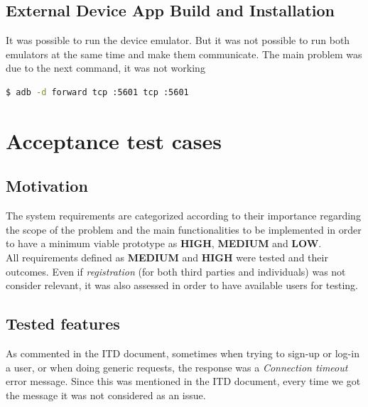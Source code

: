 \documentclass[a4paper, hidelinks, 12pt]{report}
\begin{document}
\begin{itemize}
\begin{enumerate}
	\section{External Device App Build and Installation}
	It was possible to run the device emulator. But it was not possible to run both emulators at the same time and make them communicate. The main problem was due to the next command, it was not working
	
		\begin{lstlisting}[language=bash]
			$ adb -d forward tcp :5601 tcp :5601
		\end{lstlisting}
	
		\end{enumerate}
	\end{itemize}

	\chapter{Acceptance test cases}
	
	\section{Motivation}
	The system requirements are categorized according to their importance regarding the scope of the problem and the main functionalities to be implemented in order to have a minimum viable prototype as \textbf{HIGH}, \textbf{MEDIUM} and \textbf{LOW}. \\

	All requirements defined as \textbf{MEDIUM} and \textbf{HIGH} were tested and their outcomes. Even if \textit{registration} (for both third parties and individuals) was not consider relevant, it was also assessed in order to have available users for testing.

	\section{Tested features}
	As commented in the ITD document, sometimes when trying to sign-up or log-in a user, or when doing generic requests, the response was a \textit{Connection timeout} error message. Since this was mentioned in the ITD document, every time we got the message it was not considered as an issue.\\
	
\end{document}

